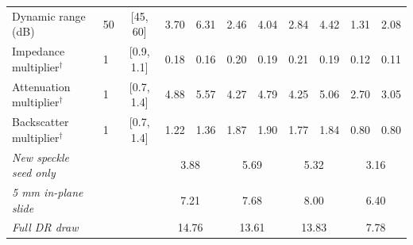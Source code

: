 \begin{table}[tp]
\begin{tabular}{@{}llc@{\hspace{12pt}}rr@{\hspace{12pt}}rr@{\hspace{12pt}}rr@{\hspace{12pt}}rr@{}}
Dynamic range (dB) & 50 & [45, 60] & 3.70 & 6.31 & 2.46 & 4.04 & 2.84 & 4.42 & 1.31 & 2.08 \\
Impedance multiplier$^{\dagger}$ & 1 & [0.9, 1.1] & 0.18 & 0.16 & 0.20 & 0.19 & 0.21 & 0.19 & 0.12 & 0.11 \\
Attenuation multiplier$^{\dagger}$ & 1 & [0.7, 1.4] & 4.88 & 5.57 & 4.27 & 4.79 & 4.25 & 5.06 & 2.70 & 3.05 \\
Backscatter multiplier$^{\dagger}$ & 1 & [0.7, 1.4] & 1.22 & 1.36 & 1.87 & 1.90 & 1.77 & 1.84 & 0.80 & 0.80 \\
\midrule
\textit{New speckle seed only} & & & \multicolumn{2}{c}{3.88} & \multicolumn{2}{c}{5.69} & \multicolumn{2}{c}{5.32} & \multicolumn{2}{c}{3.16} \\
\textit{5 mm in-plane slide} & & & \multicolumn{2}{c}{7.21} & \multicolumn{2}{c}{7.68} & \multicolumn{2}{c}{8.00} & \multicolumn{2}{c}{6.40} \\
\textit{Full DR draw} & & & \multicolumn{2}{c}{14.76} & \multicolumn{2}{c}{13.61} & \multicolumn{2}{c}{13.83} & \multicolumn{2}{c}{7.78} \\
\bottomrule
\end{tabular}
\end{table}
